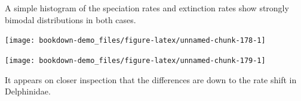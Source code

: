 \documentclass[
]{book}
\newenvironment{Shaded}{\begin{snugshade}}{\end{snugshade}}
\newcommand{\DataTypeTok}[1]{\textcolor[rgb]{0.13,0.29,0.53}{#1}}
\newcommand{\KeywordTok}[1]{\textcolor[rgb]{0.13,0.29,0.53}{\textbf{#1}}}
\newcommand{\NormalTok}[1]{#1}
\newcommand{\OperatorTok}[1]{\textcolor[rgb]{0.81,0.36,0.00}{\textbf{#1}}}
\newcommand{\StringTok}[1]{\textcolor[rgb]{0.31,0.60,0.02}{#1}}
\begin{document}
A simple histogram of the speciation rates and extinction rates show strongly bimodal distributions in both cases.

\begin{Shaded}
\end{Shaded}

\begin{center}\texttt{[image: bookdown-demo\_files/figure-latex/unnamed-chunk-178-1]} \end{center}

\begin{Shaded}
\end{Shaded}

\begin{center}\texttt{[image: bookdown-demo\_files/figure-latex/unnamed-chunk-179-1]} \end{center}

It appears on closer inspection that the differences are down to the rate shift in Delphinidae.
\end{document}
